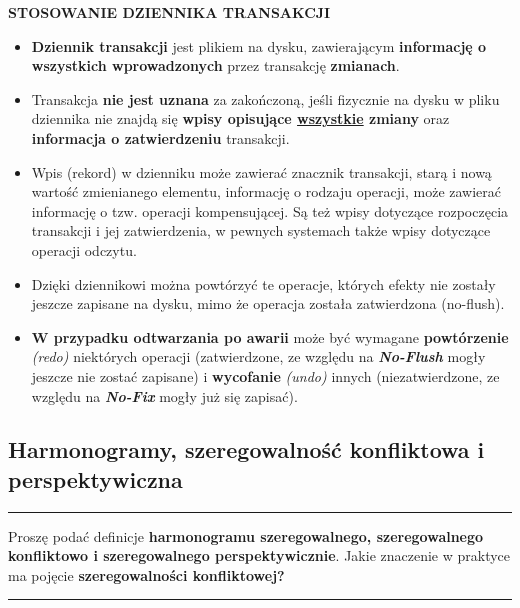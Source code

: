 \documentclass[a5paper,6pt]{article}
\newcommand{\horrule}[1]{\rule{\linewidth}{#1}}
\begin{document}
    \textbf{STOSOWANIE DZIENNIKA TRANSAKCJI}
    \begin{itemize}
        \item \textbf{Dziennik transakcji} jest plikiem na dysku, zawierającym
              \textbf{informację o\\ wszystkich wprowadzonych} przez transakcję
              \textbf{zmianach}.
        \item Transakcja \textbf{nie jest uznana} za zakończoną, jeśli fizycznie
              na dysku w pliku dziennika nie znajdą się \textbf{wpisy opisujące
              \underline{wszystkie} zmiany} oraz \textbf{informacja o
              zatwierdzeniu} transakcji.
        \item Wpis (rekord) w dzienniku może zawierać znacznik transakcji, starą
              i nową wartość zmienianego elementu, informację o rodzaju
              operacji, może zawierać informację o tzw. operacji kompensującej.
              Są też wpisy dotyczące rozpoczęcia transakcji i jej
              zatwierdzenia, w pewnych systemach także wpisy dotyczące operacji
              odczytu.
        \item Dzięki dziennikowi można powtórzyć te operacje, których efekty nie
              zostały jeszcze zapisane na dysku, mimo że operacja została
              zatwierdzona (no-flush).
        \item \textbf{W przypadku odtwarzania po awarii} może być wymagane
              \textbf{powtórzenie} \textit{(redo)} niektórych operacji
              (zatwierdzone, ze względu na \textit{\textbf{No-Flush}} mogły\\
              jeszcze nie zostać zapisane) i \textbf{wycofanie} \textit{(undo)}
              innych (niezatwierdzone, ze względu na \textit{\textbf{No-Fix}}
              mogły już się zapisać).
    \end{itemize}


\pagebreak

    \subsection{Harmonogramy, szeregowalność konfliktowa i perspektywiczna}
    \label{sub:harmonogramy_szeregowalnosc_konfliktowa_i_perspektywiczna}

    \horrule{0.5pt}
    Proszę podać definicje \textbf{harmonogramu szeregowalnego, szeregowalnego
    konfliktowo i szeregowalnego perspektywicznie}. Jakie znaczenie w praktyce
    ma pojęcie \textbf{szeregowalności konfliktowej?}\\
    \horrule{0.5pt}
\end{document}

